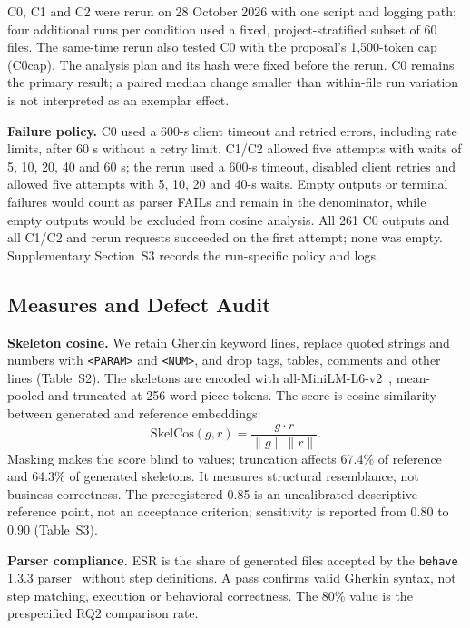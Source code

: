 C0, C1 and C2 were rerun on 28 October 2026 with one script and logging path; four additional runs per condition used a fixed, project-stratified subset of 60 files. The same-time rerun also tested C0 with the proposal's 1,500-token cap (C0cap). The analysis plan and its hash were fixed before the rerun. C0 remains the primary result; a paired median change smaller than within-file run variation is not interpreted as an exemplar effect.

\textbf{Failure policy.} C0 used a 600-s client timeout and retried errors, including rate limits, after 60 s without a retry limit. C1/C2 allowed five attempts with waits of 5, 10, 20, 40 and 60 s; the rerun used a 600-s timeout, disabled client retries and allowed five attempts with 5, 10, 20 and 40-s waits. Empty outputs or terminal failures would count as parser FAILs and remain in the denominator, while empty outputs would be excluded from cosine analysis. All 261 C0 outputs and all C1/C2 and rerun requests succeeded on the first attempt; none was empty. Supplementary Section~S3 records the run-specific policy and logs.

\subsection{Measures and Defect Audit}

\textbf{Skeleton cosine.} We retain Gherkin keyword lines, replace quoted strings and numbers with \texttt{<PARAM>} and \texttt{<NUM>}, and drop tags, tables, comments and other lines (Table~S2). The skeletons are encoded with all-MiniLM-L6-v2~\cite{reimers2019,minilm_card}, mean-pooled and truncated at 256 word-piece tokens. The score is cosine similarity between generated and reference embeddings:
\begin{equation}
\mathrm{SkelCos}(g,r)=\frac{g\cdot r}{\lVert g\rVert\lVert r\rVert}.
\end{equation}
Masking makes the score blind to values; truncation affects 67.4\% of reference and 64.3\% of generated skeletons. It measures structural resemblance, not business correctness. The preregistered 0.85 is an uncalibrated descriptive reference point, not an acceptance criterion; sensitivity is reported from 0.80 to 0.90 (Table~S3).

\textbf{Parser compliance.} ESR is the share of generated files accepted by the \texttt{behave} 1.3.3 parser~\cite{behave133} without step definitions. A pass confirms valid Gherkin syntax, not step matching, execution or behavioral correctness. The 80\% value is the prespecified RQ2 comparison rate.


